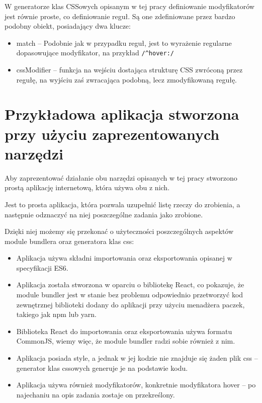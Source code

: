 \documentclass{SGGW-thesis}
\begin{document}
W generatorze klas CSSowych opisanym w tej pracy definiowanie modyfikatorów jest równie proste, co definiowanie reguł. Są one zdefiniowane przez bardzo podobny obiekt, posiadający dwa klucze:
\begin{itemize}
    \item match -- Podobnie jak w przypadku reguł, jest to wyrażenie regularne dopasowujące modyfikator, na przykład \verb|/^hover:/|
    \item cssModifier -- funkcja na wejściu dostająca strukturę CSS zwróconą przez regułę, na wyjściu zaś zwracająca podobną, lecz zmodyfikowaną regułę.
\end{itemize}


\chapter{Przykładowa aplikacja stworzona przy użyciu zaprezentowanych narzędzi}
Aby zaprezentować działanie obu narzędzi opisanych w tej pracy stworzono prostą aplikację internetową, która używa obu z nich.

Jest to prosta aplikacja, która pozwala uzupełnić listę rzeczy do zrobienia, a następnie odznaczyć na niej poszczególne zadania jako zrobione.

Dzięki niej możemy się przekonać o użyteczności poszczególnych aspektów module bundlera oraz generatora klas css:
\begin{itemize}
    \item Aplikacja używa składni importowania oraz eksportowania opisanej w specyfikacji ES6.
    \item Aplikacja została stworzona w oparciu o bibliotekę React, co pokazuje, że module bundler jest w stanie bez problemu odpowiednio przetworzyć kod zewnętrznej biblioteki dodany do aplikacji przy użyciu menadżera paczek, takiego jak npm lub yarn.
    \item Biblioteka React do importowania oraz eksportowania używa formatu CommonJS, wiemy więc, że module bundler radzi sobie również z nim.
    \item Aplikacja posiada style, a jednak w jej kodzie nie znajduje się żaden plik css -- generator klas cssowych generuje je na podstawie kodu.
    \item Aplikacja używa również modyfikatorów, konkretnie modyfikatora hover -- po najechaniu na opis zadania zostaje on przekreślony.
\end{itemize}
\end{document}
